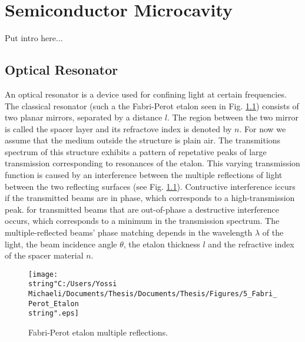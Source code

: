 %

\chapter{Semiconductor Microcavity}

\label{cha:Microcavity}%
\begin{lyxgreyedout}
 Put intro here... 
\end{lyxgreyedout}



\section{Optical Resonator}

An optical resonator is a device used for confining light at certain
frequencies. The classical resonator (such a the Fabri-Perot etalon
seen in Fig. \ref{fig:etalon-multiple_reflections}) consists of two
planar mirrors, separated by a distance $l$. The region between the
two mirror is called the spacer layer and its refractove index is
denoted by $n$. For now we assume that the medium outside the structure
is plain air. The transmitions spectrum of this structure exhibits
a pattern of repetative peaks of large transmission corresponding
to resonances of the etalon. This varying transmission function is
caused by an interference between the multiple reflections of light
between the two reflecting surfaces (see Fig. \ref{fig:etalon-multiple_reflections}).
Contructive interference iccurs if the transmitted beams are in phase,
which corresponds to a high-transmission peak. for transmitted beams
that are out-of-phase a destructive interference occurs, which corresponds
to a minimum in the transmission spectrum. The multiple-reflected
beams' phase matching depends in the wavelength $\lambda$ of the
light, the beam incidence angle $\theta$, the etalon thickness $l$
and the refractive index of the spacer material $n$.

%
\begin{figure}
\begin{centering}
\texttt{[image: \\string"C:/Users/Yossi Michaeli/Documents/Thesis/Documents/Thesis/Figures/5\_Fabri\_Perot\_Etalon\\string".eps]}
\par\end{centering}

\caption{\label{fig:etalon-multiple_reflections}Fabri-Perot etalon multiple
reflections.}



\end{figure}


